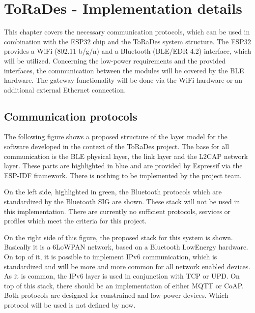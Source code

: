 \documentclass[]{scrreprt}%
\begin{document}

\chapter{ToRaDes - Implementation details}

This chapter covers the necessary communication protocols, which can be used in combination with the ESP32 chip
and the ToRaDes system structure. The ESP32 provides a WiFi (802.11 b/g/n) and a Bluetooth (BLE/EDR 4.2) interface, which
will be utilized.
Concerning the low-power requirements and the provided interfaces, the communication between the modules will be covered by the
BLE hardware. The gateway functionality will be done via the WiFi hardware or an additional external Ethernet connection.

\section{Communication protocols}

The following figure shows a proposed structure of the layer model for the software developed in the context of the ToRaDes project.
The base for all communication is the BLE physical layer, the link layer and the L2CAP network layer. These parts are highlighted in blue and are provided
by Espressif via the ESP-IDF framework. There is nothing to be implemented by the project team.

On the left side, highlighted in green, the Bluetooth protocols which are standardized by the Bluetooth SIG are shown. These stack will not
be used in this implementation. There are currently no sufficient protocols, services or profiles which meet the criteria for this project.

On the right side of this figure, the proposed stack for this system is shown. Basically it is a 6LoWPAN network, based on a Bluetooth LowEnergy
hardware. On top of it, it is possible to implement IPv6 communication, which is standardized and will be more and more common for all network enabled
devices. As it is common, the IPv6 layer is used in conjunction with TCP or UPD. On top of this stack, there should be an implementation of
either MQTT or CoAP. Both protocols are designed for constrained and low power devices. Which protocol will be used is not defined by now.
\end{document}

